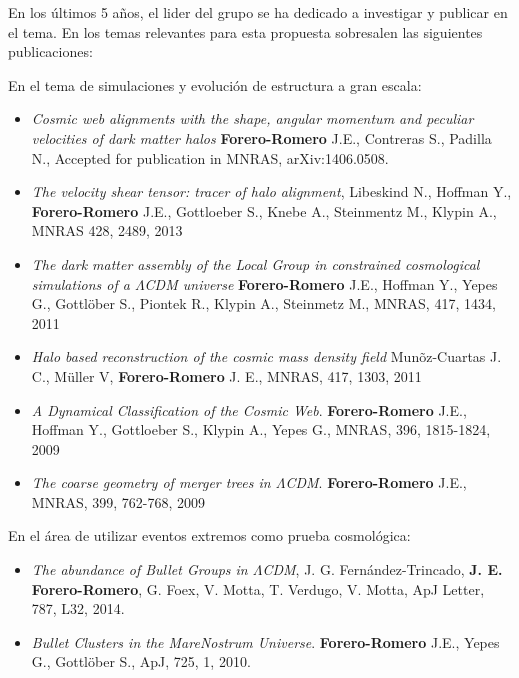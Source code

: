 En los \'ultimos 5 a\~nos, el lider del grupo se ha dedicado a
investigar y publicar en el tema. En los temas relevantes para esta
propuesta sobresalen las siguientes publicaciones:

\noindent
En el tema de simulaciones y evoluci\'on de estructura a gran escala:

\begin{itemize}

\item {\it Cosmic web alignments with the shape, angular momentum and
  peculiar velocities of dark matter halos} {\bf Forero-Romero} J.E.,
  Contreras S., Padilla N., Accepted for publication in MNRAS,
  arXiv:1406.0508.

\item{\it The velocity shear tensor: tracer of halo alignment},
  Libeskind N., Hoffman Y., {\bf Forero-Romero} J.E., Gottloeber S.,
  Knebe A., Steinmentz M., Klypin A., MNRAS 428, 2489, 2013 

\item
{\it The dark matter assembly of the Local Group in constrained cosmological
  simulations of a $\Lambda$CDM universe} {\bf Forero-Romero} J.E., Hoffman Y., Yepes G., Gottl\"ober S.,
  Piontek R., Klypin A., Steinmetz M., 
MNRAS, 417, 1434, 2011

\item
{\it Halo based reconstruction of the cosmic mass density field}
Mun\~oz-Cuartas J. C., M\"uller V, {\bf Forero-Romero} J. E., MNRAS,
417, 1303, 2011  

\item
{\it A Dynamical Classification of the  Cosmic Web}.  {\bf
  Forero-Romero} J.E., Hoffman Y.,  Gottloeber S., Klypin A., Yepes G., MNRAS, 396, 1815-1824, 2009 

\item 
{\it The coarse geometry of merger trees in
  $\Lambda$CDM}.  {\bf Forero-Romero} J.E., 
MNRAS, 399, 762-768, 2009

\end{itemize}

\noindent
En el \'area de utilizar eventos extremos como prueba cosmol\'ogica:

\begin{itemize}
\item{\it The abundance of Bullet Groups in $\Lambda$CDM},
  J. G. Fern\'andez-Trincado, {\bf J. E. Forero-Romero}, G. Foex,
  V. Motta, T. Verdugo, V. Motta, ApJ Letter, 787, L32, 2014.
\item
{\it Bullet Clusters in the MareNostrum Universe}. 
{\bf Forero-Romero} J.E., Yepes G., Gottl\"ober S., 
ApJ, 725, 1, 2010.
\end{itemize}


